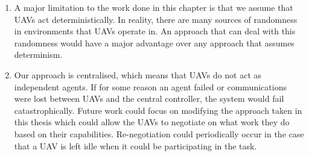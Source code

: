 \begin{enumerate}

    \item A major limitation to the work done in this chapter is that we assume that UAVs act deterministically. In reality, there are many sources of randomness in environments that UAVs operate in. An approach that can deal with this randomness would have a major advantage over any approach that assumes determinism.
    
    \item Our approach is centralised, which means that UAVs do not act as independent agents. If for some reason an agent failed or communications were lost between UAVs and the central controller, the system would fail catastrophically. Future work could focus on modifying the approach taken in this thesis which could allow the UAVs to negotiate on what work they do based on their capabilities. Re-negotiation could periodically occur in the case that a UAV is left idle when it could be participating in the task.
    

\end{enumerate}

